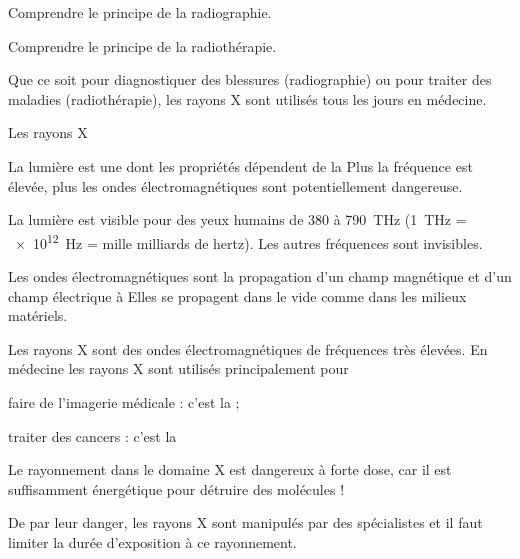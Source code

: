 \teteTermStssImag
\vspace*{-36pt}

\begin{objectifs}
  \item Comprendre le principe de la radiographie.
  \item Comprendre le principe de la radiothérapie.
\end{objectifs}

\begin{contexte}
  Que ce soit pour diagnostiquer des blessures (radiographie) ou pour traiter des maladies (radiothérapie), les rayons X sont utilisés tous les jours en médecine.

\end{contexte}


\begin{doc}{Les rayons X}
  \begin{center}  
  \end{center}
  
  La lumière est une  dont les propriétés dépendent de la 
  Plus la fréquence est élevée, plus les ondes électromagnétiques sont potentiellement dangereuse.
  
  La lumière est visible pour des yeux humains de 380 à \qty{790}{\tera\hertz} (\qty{1}{\tera\hertz} = \qty{e12}{\hertz} = mille milliards de hertz).
  Les autres fréquences sont invisibles.

  Les ondes électromagnétiques sont la propagation d'un champ magnétique et d'un champ électrique à 
  Elles se propagent dans le vide comme dans les milieux matériels.
  
  \begin{importants}
    Les rayons X sont des ondes électromagnétiques de fréquences très élevées.
    En médecine les rayons X sont utilisés principalement pour
    \begin{listePoints}  
      \item faire de l'imagerie médicale : c'est la  ;
      \item traiter des cancers : c'est la 
    \end{listePoints}
  \end{importants}

  Le rayonnement dans le domaine X est dangereux à forte dose, car il est suffisamment énergétique pour détruire des molécules !

  De par leur danger, les rayons X sont manipulés par des spécialistes et il faut limiter la durée d'exposition à ce rayonnement.
\end{doc}


